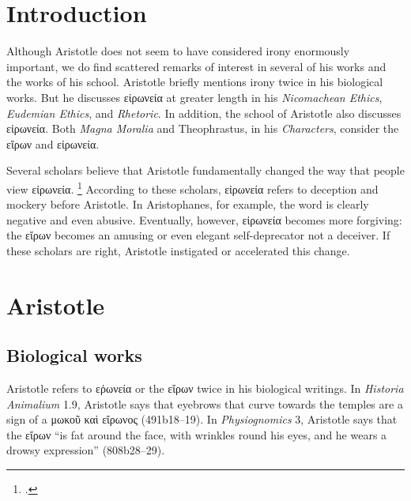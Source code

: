 \documentclass[12pt,letterpaper]{article}
\begin{document}

\pagestyle{notes}

\section*{Introduction}

Although Aristotle does not seem to have considered irony enormously important, we do find scattered remarks of interest in several of his works and the works of his school.
Aristotle briefly mentions irony twice in his biological works.
But he discusses \textgreek{εἰρωνεία} at greater length in his \textit{Nicomachean Ethics}, \textit{Eudemian Ethics}, and \textit{Rhetoric}.
In addition, the school of Aristotle also discusses \textgreek{εἰρωνεία}.
Both \textit{Magna Moralia} and Theophrastus, in his \textit{Characters}, consider the \textgreek{εἴρων} and \textgreek{εἰρωνεία}.

Several scholars believe that Aristotle fundamentally changed the way that people view \textgreek{εἰρωνεία}.
\footcites[See, for example, ][]{ribbeck-begriff-eiron-1876}{gooch-socratic-irony-and-arisotles-eiron-1987}{lane-reconsidering-socratic-irony-2011}
According to these scholars, \textgreek{εἰρωνεία} refers to deception and mockery before Aristotle.
In Aristophanes, for example, the word is clearly negative and even abusive.
Eventually, however, \textgreek{εἰρωνεία} becomes more forgiving: the \textgreek{εἴρων} becomes an amusing or even elegant self-deprecator not a deceiver.
If these scholars are right, Aristotle instigated or accelerated this change.

\section*{Aristotle}

\subsection*{Biological works}

Aristotle refers to \textgreek{εῤωνεία} or the \textgreek{εἴρων} twice in his biological writings.
In \textit{Historia Animalium} 1.9, Aristotle says that eyebrows that curve towards the temples are a sign of a \textgreek{μωκοῦ καὶ εἴρωνος} (491b18--19).
In \textit{Physiognomics} 3, Aristotle says that the \textgreek{εἴρων} ``is fat around the face, with wrinkles round his eyes, and he wears a drowsy expression'' (808b28--29).
\end{document}
